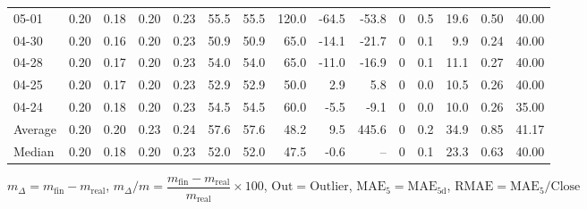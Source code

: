 \begin{threeparttable}
{\begin{tabular}{lrrrrrrrrrrrrrr}
  05-01 &          0.20 &          0.18 &          0.20 &        0.23 &                55.5 &               55.5 &               120.0 &      -64.5 &        -53.8 &              0 &                 0.5 &             19.6 &            0.50 &                  40.00 \\
  04-30 &          0.20 &          0.16 &          0.20 &        0.23 &                50.9 &               50.9 &                65.0 &      -14.1 &        -21.7 &              0 &                 0.1 &              9.9 &            0.24 &                  40.00 \\
  04-28 &          0.20 &          0.17 &          0.20 &        0.23 &                54.0 &               54.0 &                65.0 &      -11.0 &        -16.9 &              0 &                 0.1 &             11.1 &            0.27 &                  40.00 \\
  04-25 &          0.20 &          0.17 &          0.20 &        0.23 &                52.9 &               52.9 &                50.0 &        2.9 &          5.8 &              0 &                 0.0 &             10.5 &            0.26 &                  40.00 \\
  04-24 &          0.20 &          0.18 &          0.20 &        0.23 &                54.5 &               54.5 &                60.0 &       -5.5 &         -9.1 &              0 &                 0.0 &             10.0 &            0.26 &                  35.00 \\
Average &          0.20 &          0.20 &          0.23 &        0.24 &                57.6 &               57.6 &                48.2 &        9.5 &        445.6 &              0 &                 0.2 &             34.9 &            0.85 &                  41.17 \\
 Median &          0.20 &          0.18 &          0.20 &        0.23 &                52.0 &               52.0 &                47.5 &       -0.6 &           -- &              0 &                 0.1 &             23.3 &            0.63 &                  40.00 \\
\bottomrule
\end{tabular}
}
\begin{tablenotes}\footnotesize
\item $m_\Delta=m_{\text{fin}}-m_{\text{real}}$,
$m_\Delta/m=\dfrac{m_{\text{fin}}-m_{\text{real}}}{m_{\text{real}}}\times100$,
$\mathrm{Out}=\text{Outlier}$,
$\mathrm{MAE}_5=\mathrm{MAE}_{5\text{d}}$,
$\mathrm{RMAE}=\mathrm{MAE}_5/\text{Close}$
\end{tablenotes}
\end{threeparttable}
\endgroup

